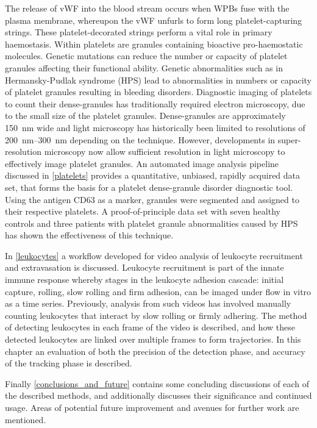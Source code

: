 The release of vWF into the blood stream occurs when WPBs fuse with the plasma membrane, whereupon the vWF unfurls to form long platelet-capturing strings. These platelet-decorated strings perform a vital role in primary haemostasis. Within platelets are granules containing bioactive pro-haemostatic molecules. Genetic mutations can reduce the number or capacity of platelet granules affecting their functional ability. Genetic abnormalities such as in Hermansky-Pudlak syndrome (HPS) lead to abnormalities in numbers or capacity of platelet granules resulting in bleeding disorders. Diagnostic imaging of platelets to count their dense-granules has traditionally required electron microscopy, due to the small size of the platelet granules. Dense-granules are approximately \SI{150}{\nano\metre} wide and light microscopy has historically been limited to resolutions of \SIrange{200}{300}{\nano\metre} depending on the technique. However, developments in super-resolution microscopy now allow sufficient resolution in light microscopy to effectively image platelet granules. An automated image analysis pipeline discussed in \autoref{platelets} provides a quantitative, unbiased, rapidly acquired data set, that forms the basis for a platelet dense-granule disorder diagnostic tool. Using the antigen CD63 as a marker, granules were segmented and assigned to their respective platelets. A proof-of-principle data set with seven healthy controls and three patients with platelet granule abnormalities caused by HPS has shown the effectiveness of this technique.

In \autoref{leukocytes} a workflow developed for video analysis of leukocyte recruitment and extravasation is discussed. Leukocyte recruitment is part of the innate immune response whereby stages in the leukocyte adhesion cascade: initial capture, rolling, slow rolling and firm adhesion, can be imaged under flow in vitro as a time series. Previously, analysis from such videos has involved manually counting leukocytes that interact by slow rolling or firmly adhering. The method of detecting leukocytes in each frame of the video is described, and how these detected leukocytes are linked over multiple frames to form trajectories. In this chapter an evaluation of both the precision of the detection phase, and accuracy of the tracking phase is described.

Finally \autoref{conclusions_and_future} contains some concluding discussions of each of the described methods, and additionally discusses their significance and continued usage. Areas of potential future improvement and avenues for further work are mentioned.
